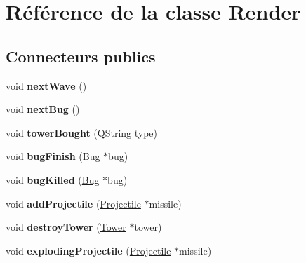 \hypertarget{classRender}{
\section{Référence de la classe Render}
\label{classRender}
}
\subsection*{Connecteurs publics}
\begin{DoxyCompactItemize}
\item 
\hypertarget{classRender_a3252d02e9509f342bc96129b4b10b415}{
void {\bfseries nextWave} ()}
\label{classRender_a3252d02e9509f342bc96129b4b10b415}

\item 
\hypertarget{classRender_a9413625fc472b4b7806f3a0d615d6ea9}{
void {\bfseries nextBug} ()}
\label{classRender_a9413625fc472b4b7806f3a0d615d6ea9}

\item 
\hypertarget{classRender_a8e2eccb2fc3914198b8939bf0625c955}{
void {\bfseries towerBought} (QString type)}
\label{classRender_a8e2eccb2fc3914198b8939bf0625c955}

\item 
\hypertarget{classRender_aeeddbbe27102625cc2d5234fa0be523a}{
void {\bfseries bugFinish} (\hyperlink{classBug}{Bug} $\ast$bug)}
\label{classRender_aeeddbbe27102625cc2d5234fa0be523a}

\item 
\hypertarget{classRender_a940007358a139d0b30e002929d24f770}{
void {\bfseries bugKilled} (\hyperlink{classBug}{Bug} $\ast$bug)}
\label{classRender_a940007358a139d0b30e002929d24f770}

\item 
\hypertarget{classRender_a3b5bb3705131ca57252398e0f6a9e3e5}{
void {\bfseries addProjectile} (\hyperlink{classProjectile}{Projectile} $\ast$missile)}
\label{classRender_a3b5bb3705131ca57252398e0f6a9e3e5}

\item 
\hypertarget{classRender_a20678c257926bfff635fded745e11f4a}{
void {\bfseries destroyTower} (\hyperlink{classTower}{Tower} $\ast$tower)}
\label{classRender_a20678c257926bfff635fded745e11f4a}

\item 
\hypertarget{classRender_aedec0cbbe4808368656b772dfe3e63f9}{
void {\bfseries explodingProjectile} (\hyperlink{classProjectile}{Projectile} $\ast$missile)}
\label{classRender_aedec0cbbe4808368656b772dfe3e63f9}

\end{DoxyCompactItemize}
